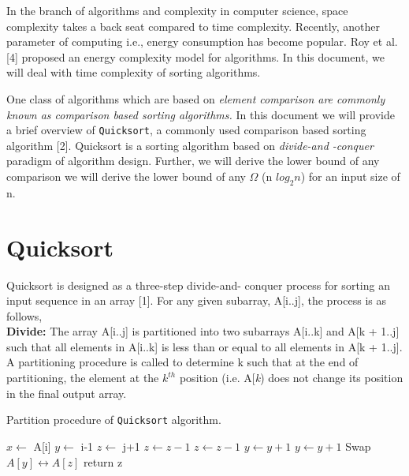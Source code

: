 \documentclass[a4paper, 10pt,twocolumn]{article}
\begin{document}
In the branch of algorithms and complexity in computer science, space complexity takes a back seat compared to time complexity. Recently, another parameter of computing i.e., energy consumption has become popular. Roy et al. [4] proposed an energy complexity model for algorithms. In this document, we will deal with time complexity of sorting
algorithms. \par
One class of algorithms which are based on \textit{element comparison are commonly known as comparison based sorting algorithms.} In this document we will provide a brief overview of \texttt{Quicksort}, a commonly used comparison based sorting algorithm [2]. Quicksort
is a sorting algorithm based on \textit{divide-and -conquer} paradigm of algorithm design. Further, we
will
derive the lower bound of any comparison we
will
derive the lower bound of any $\Omega$ (n $log_2{n}$) for an input size of n.\par

\section{Quicksort}

Quicksort is designed as a three-step divide-and-
conquer process for sorting an input sequence in
an array [1]. For any given subarray, A[i..j], the
process is as follows,\\
\textbf{Divide:} The array A[i..j] is partitioned into two
subarrays A[i..k] and A[k + 1..j] such that all elements in A[i..k] is less than or equal to all elements in A[k + 1..j]. A partitioning procedure is called to determine k such that at the end of partitioning, the element at the $k^{th}$ position (i.e. A[\textit{k}) does not change its position in the final output array.

\begin{algorithm}
  \caption{Partition procedure of \texttt{Quicksort} algorithm.}
  \label{algo:ins_sort1}
  \begin{algorithmic}[1]
     \newline
     \newline
      \State $x \leftarrow$ A[i]
      \State $y \leftarrow$ i-1
      \State $z \leftarrow$ j+1
        \State $z \leftarrow z-1$ 
          \State $z \leftarrow z -1$ 
        \EndWhile
        \State $y \leftarrow y + 1$
          \State $y \leftarrow y + 1$
        \EndWhile
        \State Swap $A[y] \leftrightarrow A[z]$
      \Else
        \State return z
      \EndIf
      \EndWhile
     \EndProcedure 
  \end{algorithmic}
\end{algorithm}
\end{document}

